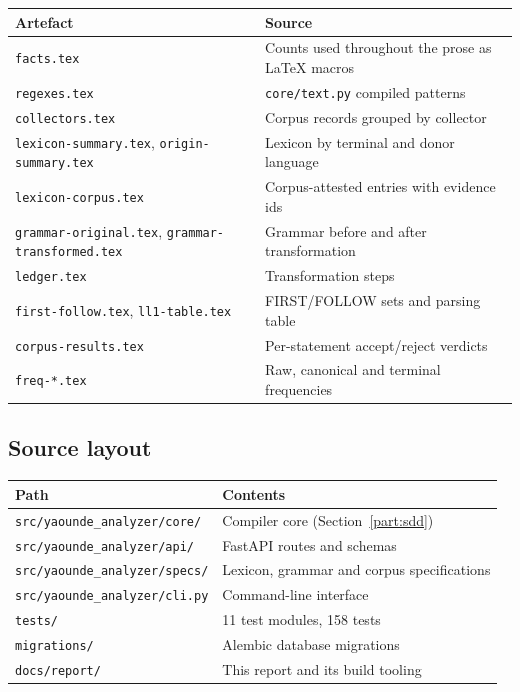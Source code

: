 \begin{center}
\small
\begin{tabular}{@{}l p{7.6cm}@{}}
\toprule
\textbf{Artefact} & \textbf{Source} \\
\midrule
\texttt{facts.tex}            & Counts used throughout the prose as \LaTeX{} macros \\
\texttt{regexes.tex}          & \texttt{core/text.py} compiled patterns \\
\texttt{collectors.tex}       & Corpus records grouped by collector \\
\texttt{lexicon-summary.tex}, \texttt{origin-summary.tex} & Lexicon by terminal and donor language \\
\texttt{lexicon-corpus.tex}   & Corpus-attested entries with evidence ids \\
\texttt{grammar-original.tex}, \texttt{grammar-transformed.tex} & Grammar before and after transformation \\
\texttt{ledger.tex}           & Transformation steps \\
\texttt{first-follow.tex}, \texttt{ll1-table.tex} & FIRST/FOLLOW sets and parsing table \\
\texttt{corpus-results.tex}   & Per-statement accept/reject verdicts \\
\texttt{freq-*.tex}           & Raw, canonical and terminal frequencies \\
\bottomrule
\end{tabular}
\end{center}

\subsection{Source layout}

\begin{center}
\small
\begin{tabular}{@{}l l@{}}
\toprule
\textbf{Path} & \textbf{Contents} \\
\midrule
\texttt{src/yaounde\_analyzer/core/}  & Compiler core (Section~\ref{part:sdd}) \\
\texttt{src/yaounde\_analyzer/api/}   & FastAPI routes and schemas \\
\texttt{src/yaounde\_analyzer/specs/} & Lexicon, grammar and corpus specifications \\
\texttt{src/yaounde\_analyzer/cli.py} & Command-line interface \\
\texttt{tests/}                       & 11 test modules, 158 tests \\
\texttt{migrations/}                  & Alembic database migrations \\
\texttt{docs/report/}                 & This report and its build tooling \\
\bottomrule
\end{tabular}
\end{center}
